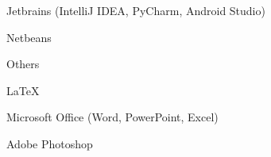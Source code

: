 \begin{cventries}
{\begin{cvitems}
                \item{Jetbrains (IntelliJ IDEA, PyCharm, Android Studio)}
                \item{Netbeans}
            \end{cvitems}
        }
    \cventry
        {}
        {Others}
        {}
        {}
        {
            \begin{cvitems}
                  \item{LaTeX}
                  \item{Microsoft Office (Word, PowerPoint, Excel)}
                  \item{Adobe Photoshop}
            \end{cvitems}
        }

\end{cventries}
